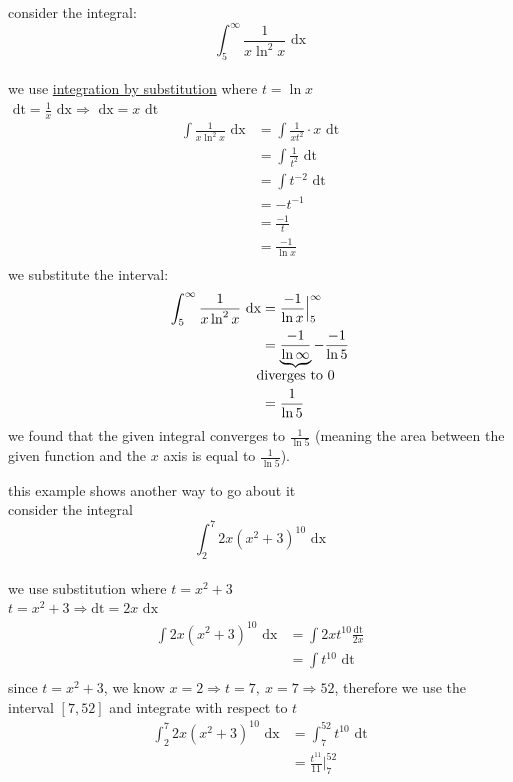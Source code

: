 \documentclass[a4paper,12pt]{article}
\newcommand{\?}{\stackrel{?}{=}}
\begin{document}
\begin{definition}
\begin{my_example}
consider the integral:\\[0pt]
\[
  \int_5^\infty \frac{1}{x\ln^2 x} \text{ dx}
\]\\[0pt]
we use \hyperref[sec:orgf2294be]{integration by substitution} where \(t = \ln x\)\\[0pt]
\(\text{ dt} = \frac1x \text{ dx} \Longrightarrow \text{ dx} = x\text{ dt}\)\\[0pt]
\begin{align*}
  \int \frac{1}{x\ln^2 x} \text{ dx} &= \int \frac{1}{xt^2} \cdot x \text{ dt}\\
  &= \int \frac{1}{t^2} \text{ dt}\\
  &= \int t^{-2} \text{ dt}\\
  &= -t^{-1}\\
  &= \frac{-1}{t}\\
  &= \frac{-1}{\ln x}\\
\end{align*}
we substitute the interval:\\[0pt]
\begin{align*}
  \int_5^\infty \frac{1}{x\ln^2 x} \text{ dx} &= \frac{-1}{\ln x} \Big|_5^\infty\\
  &= \underbrace{\frac{-1}{\ln \infty}}_{\clap{diverges to 0}} - \frac{-1}{\ln 5}\\
  &= \frac{1}{\ln 5}
\end{align*}
we found that the given integral converges to \(\frac{1}{\ln 5}\) (meaning the area between the given function and the \(x\) axis is equal to \(\frac{1}{\ln 5}\)).\\[0pt]
\end{my_example}

\begin{my_example}
this example shows another way to go about it\\[0pt]
consider the integral\\[0pt]
\[
  \int_2^7 2x{(x^2 + 3)}^{10} \text{ dx}
\]\\[0pt]
we use substitution where \(t = x^2 + 3\)\\[0pt]
\(t = x^2 + 3 \Longrightarrow \text{dt} = 2x \text{ dx}\)\\[0pt]
\begin{align*}
  \int 2x{(x^2 + 3)}^{10} \text{ dx} &= \int 2xt^{10} \frac{\text{dt}}{2x}\\
  &= \int t^{10} \text{ dt}\\
\end{align*}
since \(t = x^2 + 3\), we know \(x = 2 \Longrightarrow t = 7,\ x = 7 \Longrightarrow 52\), therefore we use the interval \([7,52]\) and integrate with respect to \(t\)\\[0pt]
\begin{align*}
  \int_2^7 2x{(x^2 + 3)}^{10} \text{ dx} &= \int_7^{52} t^{10} \text{ dt}\\
  &= \frac{t^{11}}{11} \Bigg|_7^{52}\\
\end{align*}
\end{my_example}
\end{definition}
\end{document}

